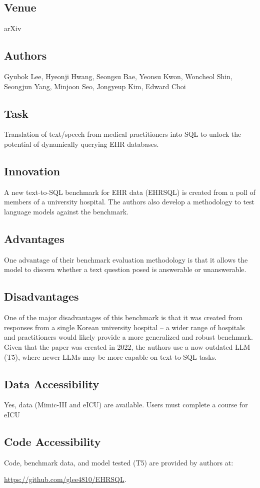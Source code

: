 \documentclass[12pt]{article}
\begin{document}
\subsection{Venue}
arXiv
\subsection{Authors}
Gyubok Lee, Hyeonji Hwang, Seongsu Bae, Yeonsu Kwon, Woncheol Shin, Seongjun Yang, Minjoon Seo, Jongyeup Kim, Edward Choi
\subsection{Task}
Translation of text/speech from medical practitioners into SQL to unlock the potential of dynamically querying EHR databases. 
\subsection{Innovation}
A new text-to-SQL benchmark for EHR data (EHRSQL) is created from a poll of members of a university hospital. The authors also develop a methodology to test language models against the benchmark. 
\subsection{Advantages}
One advantage of their benchmark evaluation methodology is that it allows the model to discern whether a text question posed is answerable or unanswerable.
\subsection{Disadvantages}
One of the major disadvantages of this benchmark is that it was created from responses from a single Korean university hospital -- a wider range of hospitals and practitioners would likely provide a more generalized and robust benchmark. Given that the paper was created in 2022, the authors use a now outdated LLM (T5), where newer LLMs may be more capable on text-to-SQL tasks.
\subsection{Data Accessibility}
Yes, data (Mimic-III and eICU) are available. Users must complete a course for eICU
\subsection{Code Accessibility}
Code, benchmark data, and model tested (T5) are provided by authors at:

\href{https://github.com/glee4810/EHRSQL}{https://github.com/glee4810/EHRSQL}.
\end{document}
